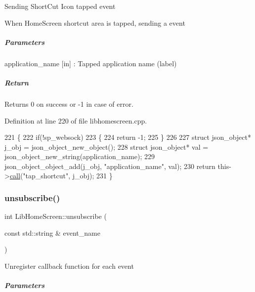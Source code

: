Sending Short\+Cut Icon tapped event

When Home\+Screen shortcut area is tapped, sending a event

\subparagraph*{Parameters}


\begin{DoxyItemize}
\item application\+\_\+name \mbox{[}in\mbox{]} \+: Tapped application name (label)
\end{DoxyItemize}

\subparagraph*{Return}


\begin{DoxyItemize}
\item Returns 0 on success or -\/1 in case of error. 
\end{DoxyItemize}

Definition at line 220 of file libhomescreen.\+cpp.


\begin{DoxyCode}
221 \{
222     \textcolor{keywordflow}{if}(!sp\_websock)
223     \{
224         \textcolor{keywordflow}{return} -1;
225     \}
226 
227     \textcolor{keyword}{struct }json\_object* j\_obj = json\_object\_new\_object();
228     \textcolor{keyword}{struct }json\_object* val = json\_object\_new\_string(application\_name);
229     json\_object\_object\_add(j\_obj, \textcolor{stringliteral}{"application\_name"}, val);
230     \textcolor{keywordflow}{return} this->\hyperlink{class_lib_home_screen_a527b49dcfe581be6275d0eb2236ba37f}{call}(\textcolor{stringliteral}{"tap\_shortcut"}, j\_obj);
231 \}
\end{DoxyCode}
\mbox{\label{class_lib_home_screen_aac03a45cbd453ba69ddb00c1016930a6}} 
\subsubsection{\texorpdfstring{unsubscribe()}{unsubscribe()}}
{\footnotesize\ttfamily int Lib\+Home\+Screen\+::unsubscribe (\begin{DoxyParamCaption}\item[{const std\+::string \&}]{event\+\_\+name }\end{DoxyParamCaption})}

Unregister callback function for each event

\subparagraph*{Parameters}


